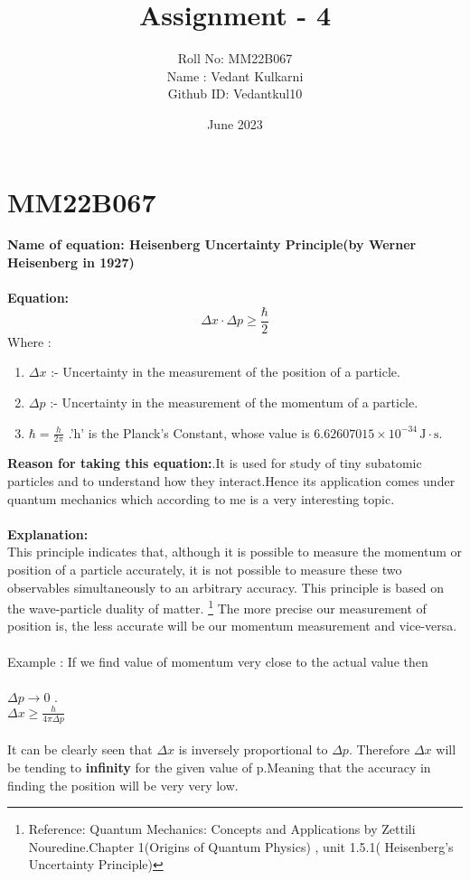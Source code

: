 \documentclass{article}
\title{Assignment - 4}
\author{Roll No: MM22B067 \\ Name : Vedant Kulkarni \\ Github ID: Vedantkul10}
\date{June 2023}
\begin{document}
\maketitle

\section*{MM22B067}
\textbf{Name of equation: Heisenberg Uncertainty Principle(by Werner Heisenberg in 1927)}
\\ \\
\textbf{Equation:}
\[
\Delta x \cdot \Delta p \geq \frac{\hbar}{2}
\]
Where :
\\
\begin{enumerate}
  \item  \(\Delta x\) :- Uncertainty in the measurement of the position of a particle.
  \item \(\Delta p\) :- Uncertainty in the measurement of the momentum of a particle.
  \item $\hbar = \frac{h}{2\pi}$ .'h' is the Planck's Constant, whose value is $6.62607015 \times 10^{-34} \, \mathrm{J} \cdot \mathrm{s}$.
  \\

\end{enumerate}
\textbf{Reason for taking this equation:}.It is used for study of tiny subatomic particles and to understand how they interact.Hence its application comes under quantum mechanics which according to me is a very interesting topic.
\\ \\
\textbf{Explanation:}
\\
This principle indicates that, although it is possible to measure the momentum or position of a particle accurately, it is not possible to measure these two observables simultaneously to an arbitrary accuracy. This principle is based on the wave-particle duality of matter. \footnote{Reference: Quantum Mechanics: Concepts and Applications by Zettili Nouredine.Chapter 1(Origins of Quantum Physics) , unit 1.5.1( Heisenberg's Uncertainty Principle)}
The more precise our measurement of position is, the less accurate will be our momentum measurement and vice-versa. 
\\ \\
Example : If we find value of momentum very close to the actual value then \\
\\ \(\Delta p \rightarrow 0\) . 
\\ \(\Delta x \geq \frac{h}{4\pi \Delta p}\)
\\ \\
It can be clearly seen that \(\Delta x\) is inversely proportional to \(\Delta p\). Therefore \(\Delta x\) will be tending to \textbf{infinity} for the given value of p.Meaning that the accuracy in finding the position will be very very low.
\end{document}
